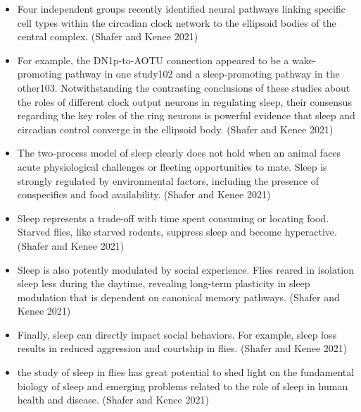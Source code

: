 \documentclass[11pt]{article}
\begin{document}
\begin{itemize}
    \item Four independent groups recently identified neural pathways linking specific cell types within the circadian clock network to the ellipsoid bodies of the central complex.
    \parencite{shaferRegulationDrosophilaSleep2021} (Shafer and Kenee 2021)

    \item For example, the DN1p-to-AOTU connection appeared to be a wake-promoting pathway in one study102 and a sleep-promoting pathway in the
    other103.
    Notwithstanding the contrasting conclusions of these studies about the roles of different clock output neurons in regulating sleep, their 
    consensus regarding the key roles of the ring neurons is powerful evidence that sleep and circadian control converge in the ellipsoid body.
    \parencite{shaferRegulationDrosophilaSleep2021} (Shafer and Kenee 2021)

    \item The two-process model of sleep clearly does not hold when an animal faces acute physiological challenges or fleeting opportunities to mate. Sleep is strongly regulated by environmental factors, including the presence of conspecifics and food availability.
    \parencite{shaferRegulationDrosophilaSleep2021} (Shafer and Kenee 2021)

    \item Sleep represents a trade-off with time spent consuming or locating food. Starved flies, like starved rodents, suppress sleep and become hyperactive.
    \parencite{shaferRegulationDrosophilaSleep2021} (Shafer and Kenee 2021)

    \item Sleep is also potently modulated by social experience. Flies reared in isolation sleep less during the daytime, revealing long-term plasticity in sleep modulation that is dependent on canonical memory pathways.
    \parencite{shaferRegulationDrosophilaSleep2021} (Shafer and Kenee 2021)

    \item Finally, sleep can directly impact social behaviors. For example, sleep loss results in reduced aggression and courtship in flies.
    \parencite{shaferRegulationDrosophilaSleep2021} (Shafer and Kenee 2021)

    \item the study of sleep in flies has great potential to shed light on the fundamental biology of sleep and emerging problems related to the role of sleep in human health and disease.
    \parencite{shaferRegulationDrosophilaSleep2021} (Shafer and Kenee 2021)


\end{itemize}
\end{document}
